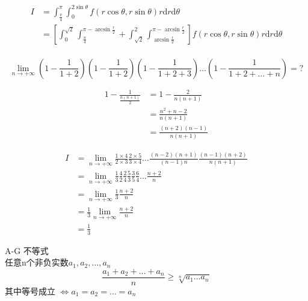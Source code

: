 
\date{2020年笔记}
\date{20.07.27}
\begin{equation}
	\begin{aligned}
		I &= \int_{\frac{\pi}{4}}^{\pi}\int_{0}^{2\sin\theta} f(r\cos\theta,r\sin\theta)r\text{d}r\text{d}\theta\\	
		&=[\int_{0}^{\sqrt{2}}\int_{\frac{\pi}{4}}^{\pi-\arcsin\frac{r}{2}} 
		+ \int_{\sqrt{2}}^{2} \int_{\arcsin\frac{r}{2}}^{\pi-\arcsin\frac{r}{2}}  ]
		f(r\cos\theta,r\sin\theta)r\text{d}r\text{d}\theta\\
	\end{aligned}
\end{equation}

\date{20.08.03}

\begin{equation}
	\lim\limits_{n \rightarrow +\infty }
(1-\frac{1}{1+2})(1-\frac{1}{1+2}) (1-\frac{1}{1+2+3})\dots(1-\frac{1}{1+2+\dots+n}) = ?
\end{equation}

\begin{equation}
	\begin{aligned}
		1-\frac{1}{\frac{n(n+1)}{2}} &= 1-\frac{2}{n(n+1)}\\
		&=\frac{n^2+n-2}{n(n+1)}\\
		&=\frac{(n+2)(n-1)}{n(n+1)}
	\end{aligned}
\end{equation}

\begin{equation}
	\begin{aligned}
		I&=\lim\limits_{n\rightarrow +\infty}\frac{1\times 4}{2\times 3}\frac{2\times 5}{3\times 4}\dots \frac{(n-2)(n+1)}{(n-1)n}\frac{(n-1)(n+2)}{n(n+1)}\\
		&=\lim\limits_{n\rightarrow+\infty}\frac{1}{3}\frac{4}{2}\frac{2}{4}\frac{5}{3}\frac{3}{5}\frac{6}{4}\dots \frac{n+2}{n}\\
		&=\lim\limits_{n\rightarrow+\infty}\frac{1}{3}\frac{n+2}{n}\\
		&=\frac{1}{3}\lim\limits_{n \rightarrow +\infty }\frac{n+2}{n}\\
		&=\frac{1}{3}
	\end{aligned}
\end{equation}

\date{20.08.07}

\begin{theorem}
A-G 不等式\\ 
任意n个非负实数$ a_1, a_2, \dots, a_n$ \\
\begin{equation}
	\frac{a_1 + a_2 + \dots + a_n}{n} \geq \sqrt[n]{a_1\dots a_n}
\end{equation}
其中等号成立 $\iff a_1 = a_2 = \dots = a_n$

\label{thm-1}
\end{theorem}

